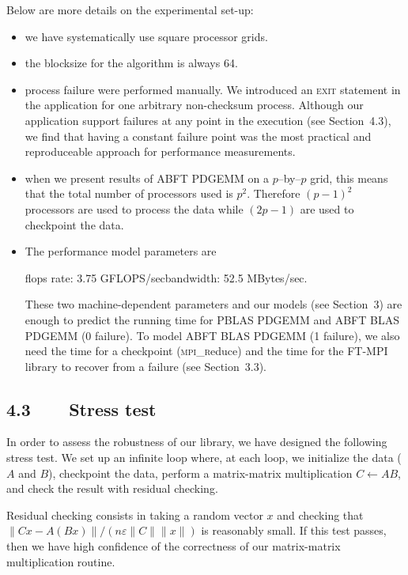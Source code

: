 \documentclass[pdftex,11pt]{article}
\begin{document}
Below are more details on the experimental set-up:
\begin{itemize}
\item we have systematically use square processor grids.
\item the blocksize for the algorithm is always 64.
\item process failure were performed manually. We introduced an
  \textsc{exit} statement in the application for one arbitrary
  non-checksum process.  Although our application support failures at
  any point in the execution (see
  Section~\color{DodgerBlue4}4.3\color{black}), we find that having
  a constant failure point was the most practical and reproduceable
  approach for performance measurements.
\item when we present results of ABFT PDGEMM on a $p$--by--$p$ grid,
  this means that the total number of processors used is
  $p^2$. Therefore $(p-1)^2$ processors are used to process the data
  while $(2p-1)$ are used to checkpoint the data.
\item The performance model parameters are
  \begin{center}flops rate: 3.75 GFLOPS/sec\hspace{1cm}bandwidth: 52.5
    MBytes/sec.\end{center} These two machine-dependent parameters and
  our models (see Section~\color{DodgerBlue4}3\color{black}) are
  enough to predict the running time for PBLAS PDGEMM and ABFT BLAS
  PDGEMM (0 failure).  To model ABFT BLAS PDGEMM (1 failure), we also
  need the time for a checkpoint (\textsc{mpi\_r}educe) and the time
  for the FT-MPI library to recover from a failure (see
  Section~\color{DodgerBlue4}3.3\color{black}).
\end{itemize}

\subsection*{\color{DodgerBlue4} 4.3~~~~Stress test}

In order to assess the robustness of our library, we have designed the
following stress test.  We set up an infinite loop where, at each
loop, we initialize the data ($A$ and $B$), checkpoint the data,
perform a matrix-matrix multiplication $ C \leftarrow AB $, and check
the result with residual checking.

Residual checking consists in taking a random vector $x$ and checking
that $\| Cx - A(Bx) \| / \left( n \varepsilon \| C \| \| x \| \right)
$ is reasonably small. If this test passes, then we have high
confidence of the correctness of our matrix-matrix multiplication
routine.
\end{document}
